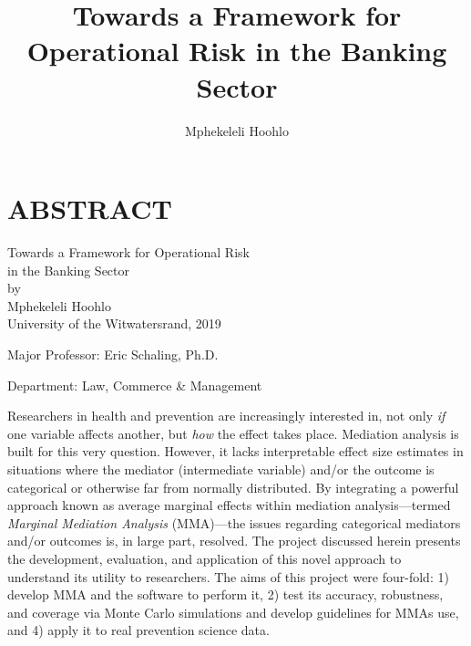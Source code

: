 \documentclass[]{DissertateUSU}
\title{Towards a Framework for Operational Risk in the Banking Sector}
\author{Mphekeleli Hoohlo}
\date{}
\begin{document}
\maketitle

 \pagestyle{empty} \copyrightpage

\newpage

\pagestyle{fancy}  \fancyhead[R]{\thepage}
\fancyfoot[C]{} \chapter*{ABSTRACT}

\doublespacing

\begin{center}
Towards a Framework for Operational Risk \\ 
in the Banking Sector \\
\vspace{12pt}
by \\
\vspace{12pt}
Mphekeleli Hoohlo \\
University of the Witwatersrand, 2019
\end{center}

\vspace{12pt}

\singlespacing
\noindent Major Professor: Eric Schaling, Ph.D.

\noindent Department: Law, Commerce \& Management

\vspace{12pt}

\doublespacing
Researchers in health and prevention are increasingly interested in, not
only \emph{if} one variable affects another, but \emph{how} the effect
takes place. Mediation analysis is built for this very question.
However, it lacks interpretable effect size estimates in situations
where the mediator (intermediate variable) and/or the outcome is
categorical or otherwise far from normally distributed. By integrating a
powerful approach known as average marginal effects within mediation
analysis---termed \emph{Marginal Mediation Analysis} (MMA)---the issues
regarding categorical mediators and/or outcomes is, in large part,
resolved. The project discussed herein presents the development,
evaluation, and application of this novel approach to understand its
utility to researchers. The aims of this project were four-fold: 1)
develop MMA and the software to perform it, 2) test its accuracy,
robustness, and coverage via Monte Carlo simulations and develop
guidelines for MMAs use, and 4) apply it to real prevention science
data.
\end{document}
